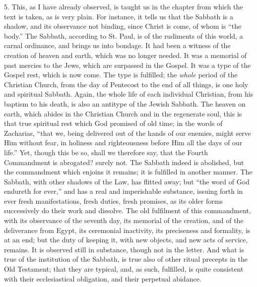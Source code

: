5. This, as I have already observed, is taught us in the chapter
from which the text is taken, as is very plain. For instance, it tells
us that the Sabbath is a shadow, and its observance not binding, since
Christ is come, of whom is ``the body.'' The Sabbath,
according to St. Paul, is of the rudiments of this world, a carnal
ordinance, and brings us into bondage. It had been a witness of the
creation of heaven and earth, which was no longer needed. It was a
memorial of past mercies to the Jews, which are surpassed in the
Gospel. It was a type of the Gospel rest, which is now come. The type
is fulfilled; the \emph{whole} period of the Christian Church, from
the day of Pentecost to the end of all things, is one holy and
spiritual Sabbath. Again, the whole life of each individual Christian,
from his baptism to his death, is also an antitype of the Jewish
Sabbath. The heaven on earth, which abides in the Christian Church and
in the regenerate soul, this is that true spiritual rest which God
promised of old time; in the words of Zacharias, ``that we, being
delivered out of the hands of our enemies, might serve Him without
fear, in holiness and righteousness before Him all the days of our
life.'' Yet, though this be so, shall we therefore say, that the
Fourth Commandment is abrogated? surely not. The Sabbath indeed is
abolished, but the commandment which enjoins it remains; it is
fulfilled in another manner. The Sabbath, with other shadows of the
Law, has flitted away; but ``the word of God endureth for
ever,'' and has a real and imperishable substance, issuing forth
in ever fresh manifestations, fresh duties, fresh promises, as its
older forms successively do their work and dissolve. The old
fulfilment of this commandment, with its observance of the seventh
day, its memorial of the creation, and of the deliverance from Egypt,
its ceremonial inactivity, its preciseness and formality, is at an
end; but the duty of keeping it, with new objects, and new acts of
service, remains. It is observed still in substance, though not in the
letter. And what is true of the institution of the Sabbath, is true
also of other ritual precepts in the Old Testament; that they are
typical, and, as such, fulfilled, is quite consistent with their
ecclesiastical obligation, and their perpetual abidance.

